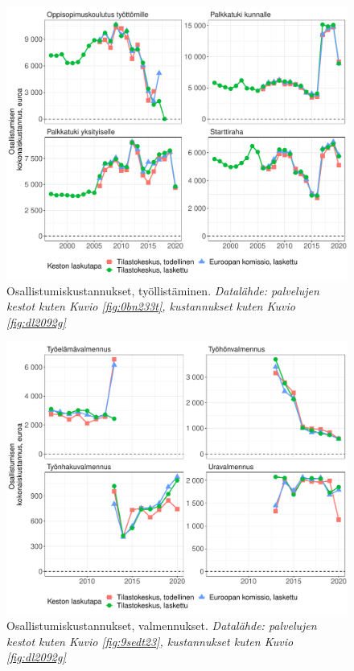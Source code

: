 \documentclass[12pt]{article}
\newcommand{\captionselite}[1] {\textit{\footnotesize{#1}}}
\begin{document}
\begin{figure}
\centering
\includegraphics[scale = 0.6]{../plots/costs/tyollistaminen_robustness.pdf}
\caption{Osallistumiskustannukset, työllistäminen. \captionselite{Datalähde: palvelujen kestot kuten Kuvio \ref{fig:0bn233t}, kustannukset kuten Kuvio \ref{fig:dl2092g}}}
   \label{fig:f0982h3t}
\end{figure}

\begin{figure}
\centering
\includegraphics[scale = 0.6]{../plots/costs/valmennus_robustness.pdf}
\caption{Osallistumiskustannukset, valmennukset. \captionselite{Datalähde: palvelujen kestot kuten Kuvio \ref{fig:9sedt23}, kustannukset kuten Kuvio \ref{fig:dl2092g}}}
   \label{fig:9f82gf23}
\end{figure}
\end{document}
